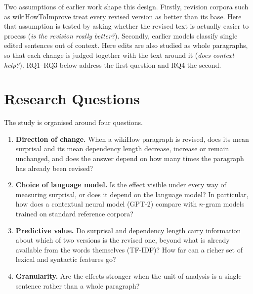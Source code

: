 \documentclass[12pt,a4paper,oneside]{report}
\begin{document}
Two assumptions of earlier work shape this design. Firstly, revision corpora such as wikiHowToImprove \citep{anthonio2020} treat every revised version as better than its base. Here that assumption is tested by asking whether the revised text is actually easier to process (\emph{is the revision really better?}). Secondly, earlier models classify single edited sentences out of context. Here edits are also studied as whole paragraphs, so that each change is judged together with the text around it (\emph{does context help?}). RQ1--RQ3 below address the first question and RQ4 the second.

\clearpage
\section{Research Questions}
The study is organised around four questions.
\begin{enumerate}[label=\textbf{RQ\arabic*.},leftmargin=*]
  \item \textbf{Direction of change.} When a wikiHow paragraph is revised, does its mean surprisal and its mean dependency length decrease, increase or remain unchanged, and does the answer depend on how many times the paragraph has already been revised?
  \item \textbf{Choice of language model.} Is the effect visible under every way of measuring surprisal, or does it depend on the language model? In particular, how does a contextual neural model (GPT-2) compare with $n$-gram models trained on standard reference corpora?
  \item \textbf{Predictive value.} Do surprisal and dependency length carry information about which of two versions is the revised one, beyond what is already available from the words themselves (TF-IDF)? How far can a richer set of lexical and syntactic features go?
  \item \textbf{Granularity.} Are the effects stronger when the unit of analysis is a single sentence rather than a whole paragraph?
\end{enumerate}
\end{document}
